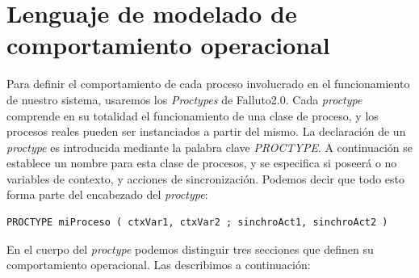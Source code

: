 \documentclass[titlepage, 12pt]{book}
\begin{document}
\section{Lenguaje de modelado de comportamiento operacional}
Para definir el comportamiento de cada proceso involucrado en el funcionamiento de nuestro sistema, usaremos los \textit{Proctypes} de Falluto2.0. Cada \textit{proctype} comprende en su totalidad el funcionamiento de una clase de proceso, y los procesos reales pueden ser instanciados a partir del mismo. La declaraci\'on de un \textit{proctype} es introducida mediante la palabra clave \textit{PROCTYPE}. A continuaci\'on se establece un nombre para esta clase de procesos, y se especifica si poseer\'a o no variables de contexto, y acciones de sincronizaci\'on. Podemos decir que todo esto forma parte del encabezado del \textit{proctype}:
\begin{verbatim}
PROCTYPE miProceso ( ctxVar1, ctxVar2 ; sinchroAct1, sinchroAct2 )
\end{verbatim}
En el cuerpo del \textit{proctype} podemos distinguir tres secciones que definen su comportamiento operacional. Las describimos a continuaci\'on:
\end{document}
